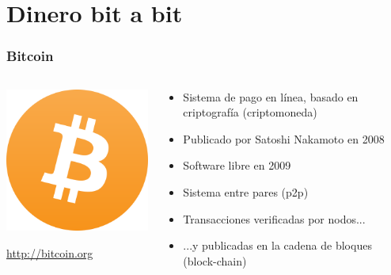 %
%

\section{Dinero bit a bit}

\begin{frame}
\frametitle{Bitcoin}

\begin{columns}[T]
\begin{column}{.38\textwidth}
\includegraphics[width=6.5cm]{figs/bitcoin-logo}

\begin{flushright}
\url{http://bitcoin.org}
\end{flushright}

\end{column}%
\hfill%
\begin{column}{.60\textwidth}
{\Large
\begin{itemize}
\item Sistema de pago en línea, basado en criptografía (criptomoneda) \\
\item Publicado por Satoshi Nakamoto en 2008
\item Software libre en 2009
\item Sistema entre pares (p2p)
\item Transacciones verificadas por nodos...
\item ...y publicadas en la cadena de bloques (block-chain)
\end{itemize}
}
\end{column}%
\end{columns}

\end{frame}

